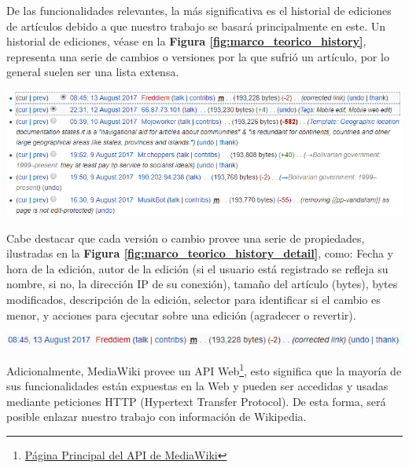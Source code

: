 De las funcionalidades relevantes, la más significativa es el historial de ediciones de artículos debido a que nuestro trabajo se basará principalmente en este. Un historial de ediciones, véase en la \textbf{Figura \ref{fig:marco_teorico_history}}, representa una serie de cambios o versiones por la que sufrió un artículo, por lo general suelen ser una lista extensa.

\begin{center}
    \bigbreak
    \includegraphics[scale=0.40]{images/marco_teorico/history.png}
    \label{fig:marco_teorico_history}
    \bigbreak
\end{center}

Cabe destacar que cada versión o cambio provee una serie de propiedades, ilustradas en la \textbf{Figura \ref{fig:marco_teorico_history_detail}}, como: Fecha y hora de la edición, autor de la edición (si el usuario está registrado se refleja su nombre, si no, la dirección IP de su conexión), tamaño del artículo (bytes), bytes modificados, descripción de la edición, selector para identificar si el cambio es menor, y acciones para ejecutar sobre una edición (agradecer o revertir).

\begin{center}
    \bigbreak
    \includegraphics[scale=0.45]{images/marco_teorico/history_detail.png}
    \label{fig:marco_teorico_history_detail}
    \bigbreak
\end{center}

Adicionalmente, MediaWiki provee un API Web\footnote{\href{https://www.mediawiki.org/wiki/API:Main_page}{Página Principal del API de MediaWiki}}, esto significa que la mayoría de sus funcionalidades están expuestas en la Web y pueden ser accedidas y usadas mediante peticiones HTTP (Hypertext Transfer Protocol). De esta forma, será posible enlazar nuestro trabajo con información de Wikipedia.

